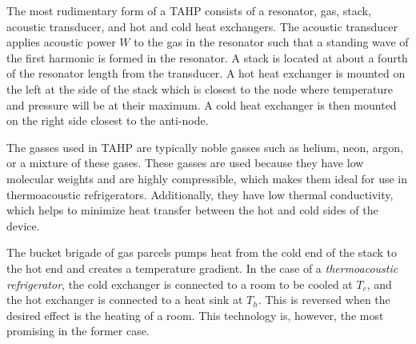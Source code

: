 \documentclass{article}
\newcommand{\newpara}
    {
      \bigbreak{}
      \noindent
    }
\begin{document}
\newpara{}
The most rudimentary form of a TAHP consists of a resonator, gas, stack, acoustic transducer, and hot and cold heat exchangers. The acoustic transducer applies acoustic power \(W\) to the gas in the resonator such that a standing wave of the first harmonic is formed in the resonator. A stack is located at about a fourth of the resonator length from the transducer. A hot heat exchanger is mounted on the left at the side of the stack which is closest to the node where temperature and pressure will be at their maximum. A cold heat exchanger is then mounted on the right side closest to the anti-node.
\newpara{}
The gasses used in TAHP are typically noble gasses such as helium, neon, argon, or a mixture of these gases. These gasses are used because they have low molecular weights and are highly compressible, which makes them ideal for use in thermoacoustic refrigerators. Additionally, they have low thermal conductivity, which helps to minimize heat transfer between the hot and cold sides of the device.
\newpara{}
The bucket brigade of gas parcels pumps heat from the cold end of the stack to the hot end and creates a temperature gradient. In the case of a \emph{thermoacoustic refrigerator}, the cold exchanger is connected to a room to be cooled at \(T_c\), and the hot exchanger is connected to a heat sink at \(T_h\). This is reversed when the desired effect is the heating of a room. This technology is, however, the most promising in the former case.
\end{document}
